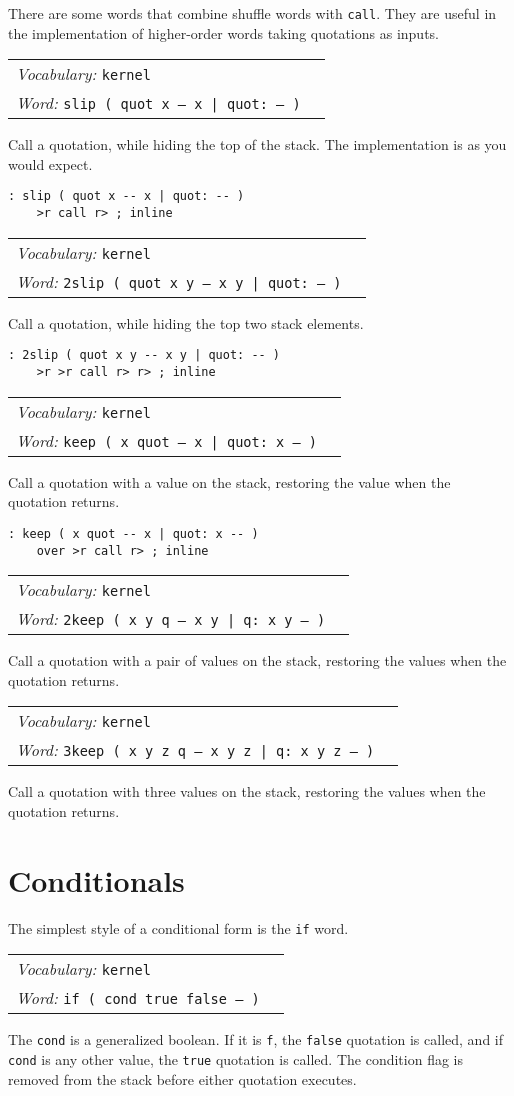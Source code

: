 \documentclass{book}
\newcommand{\vocabulary}[1]{\emph{Vocabulary:} \texttt{#1}&\\}
\newcommand{\ordinaryword}[2]{\index{\texttt{#1}}\emph{Word:} \texttt{#2}&\\}
\newcommand{\wordtable}[1]{


\begin{tabularx}{12cm}{lX}
\hline
#1
\hline
\end{tabularx}

}
\begin{document}
There are some words that combine shuffle words with \texttt{call}. They are useful in the implementation of higher-order words taking quotations as inputs.
\wordtable{
\vocabulary{kernel}
\ordinaryword{slip}{slip ( quot x -- x | quot:~-- )}
}
Call a quotation, while hiding the top of the stack. The implementation is as you would expect.
\begin{verbatim}
: slip ( quot x -- x | quot: -- )
    >r call r> ; inline
\end{verbatim}
\wordtable{
\vocabulary{kernel}
\ordinaryword{2slip}{2slip ( quot x y -- x y | quot:~-- )}
}
Call a quotation, while hiding the top two stack elements.
\begin{verbatim}
: 2slip ( quot x y -- x y | quot: -- )
    >r >r call r> r> ; inline
\end{verbatim}
\wordtable{
\vocabulary{kernel}
\ordinaryword{keep}{keep ( x quot -- x | quot:~x -- )}
}
Call a quotation with a value on the stack, restoring the value when the quotation returns.
\begin{verbatim}
: keep ( x quot -- x | quot: x -- )
    over >r call r> ; inline
\end{verbatim}
\wordtable{
\vocabulary{kernel}
\ordinaryword{2keep}{2keep ( x y q -- x y | q:~x y -- )}
}
Call a quotation with a pair of values on the stack, restoring the values when the quotation returns.
\wordtable{
\vocabulary{kernel}
\ordinaryword{3keep}{3keep ( x y z q -- x y z | q:~x y z -- )}
}
Call a quotation with three values on the stack, restoring the values when the quotation returns.

\section{Conditionals}

The simplest style of a conditional form is the \texttt{if} word.
\wordtable{
\vocabulary{kernel}
\ordinaryword{if}{if ( cond true false -- )}
}
The \texttt{cond} is a generalized boolean. If it is \texttt{f}, the \texttt{false} quotation is called, and if \texttt{cond} is any other value, the \texttt{true} quotation is called. The condition flag is removed from the stack before either quotation executes.
\end{document}
